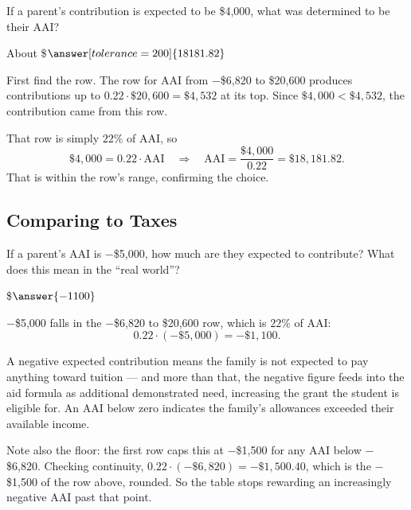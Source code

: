 \documentclass[12pt]{ximera}
\begin{document}
\begin{problem}
If a parent's contribution is expected to be \$4,000, what was determined to be their
AAI?

About \$$\answer[tolerance=200]{18181.82}$

\begin{freeResponse}
\end{freeResponse}

\begin{solution}
First find the row. The row for AAI from $-$\$6,820 to \$20,600 produces contributions
up to $0.22 \cdot \$20{,}600 = \$4{,}532$ at its top. Since $\$4{,}000 < \$4{,}532$, the
contribution came from this row.

That row is simply $22\%$ of AAI, so
\[
\$4{,}000 = 0.22 \cdot \text{AAI}
\quad\Longrightarrow\quad
\text{AAI} = \frac{\$4{,}000}{0.22} = \$18{,}181.82.
\]
That is within the row's range, confirming the choice.
\end{solution}
\end{problem}

\subsection*{Comparing to Taxes}

\begin{problem}
If a parent's AAI is $-$\$5,000, how much are they expected to contribute? What does
this mean in the ``real world''?

\$$\answer{-1100}$

\begin{freeResponse}
\end{freeResponse}

\begin{solution}
$-$\$5,000 falls in the $-$\$6,820 to \$20,600 row, which is $22\%$ of AAI:
\[
0.22 \cdot (-\$5{,}000) = -\$1{,}100.
\]

A negative expected contribution means the family is not expected to pay anything toward
tuition --- and more than that, the negative figure feeds into the aid formula as
additional demonstrated need, increasing the grant the student is eligible for. An AAI
below zero indicates the family's allowances exceeded their available income.

Note also the floor: the first row caps this at $-$\$1,500 for any AAI below
$-$\$6,820. Checking continuity, $0.22 \cdot (-\$6{,}820) = -\$1{,}500.40$, which is
the $-$\$1,500 of the row above, rounded. So the table stops rewarding an increasingly
negative AAI past that point.
\end{solution}
\end{problem}
\end{document}
